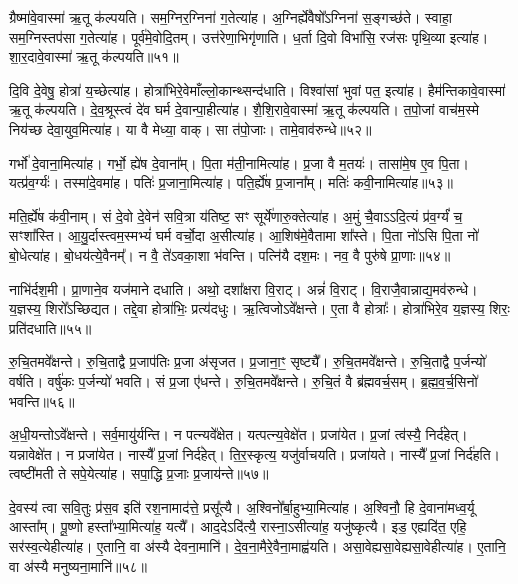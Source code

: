 ग्रैष्मा॑वे॒वास्मा॑ ऋ॒तू क॑ल्पयति। 
सम॒ग्निर॒ग्निना॑ ग॒तेत्या॑ह। 
अ॒ग्निर्ह्ये॑वैषो᳚ऽग्निना॑ स॒ङ्गच्छ॑ते। 
स्वाहा॒ सम॒ग्निस्तप॑सा ग॒तेत्या॑ह। 
पूर्व॑मे॒वोदि॒तम्। 
उत्त॑रेणा॒भिगृ॑णाति। 
ध॒र्ता दि॒वो विभा॑सि॒ रज॑सः पृथि॒व्या इत्या॑ह। 
शा॒र॒दावे॒वास्मा॑ ऋ॒तू क॑ल्पयति॥५१॥

दि॒वि दे॒वेषु॒ होत्रा॑ य॒च्छेत्या॑ह। 
होत्रा॑भिरे॒वेमाँल्लो॒कान्थ्सन्द॑\-धाति। 
विश्वा॑सां भुवां पत॒ इत्या॑ह। 
हैम॑न्तिकावे॒वास्मा॑ ऋ॒तू क॑ल्पयति। 
दे॒व॒श्रूस्त्वं दे॑व घर्म दे॒वान्पा॒हीत्या॑ह। 
शै॒शि॒रावे॒वास्मा॑ ऋ॒तू क॑ल्पयति। 
त॒पो॒जां वाच॑म॒स्मे निय॑च्छ देवा॒युव॒मित्या॑ह। 
या वै मेध्या॒ वाक्। 
सा त॑पो॒जाः। 
तामे॒वाव॑रुन्धे॥५२॥

गर्भो॑ दे॒वाना॒मित्या॑ह। 
गर्भो॒ ह्ये॑ष दे॒वाना᳚म्। 
पि॒ता म॑ती॒नामित्या॑ह। 
प्र॒जा वै म॒तयः॑। 
तासा॑मे॒ष ए॒व पि॒ता। 
यत्प्र॑व॒र्ग्यः॑। 
तस्मा॑दे॒वमा॑ह। 
पतिः॑ प्र॒जाना॒मित्या॑ह। 
पति॒र्ह्ये॑ष प्र॒जाना᳚म्। 
मतिः॑ कवी॒नामित्या॑ह॥५३॥

मति॒र्ह्ये॑ष क॑वी॒नाम्। 
सं दे॒वो दे॒वेन॑ सवि॒त्रा य॑तिष्ट॒ सꣳ सूर्ये॑णारु॒क्तेत्या॑ह। 
अ॒मुं चै॒वाऽऽदि॒त्यं प्र॑व॒र्ग्यं॑ च॒ सꣳशा᳚स्ति। 
आ॒यु॒र्दास्त्वम॒स्मभ्यं॑ घर्म वर्चो॒दा अ॒सीत्या॑ह। 
आ॒शिष॑मे॒वैतामा शा᳚स्ते। 
पि॒ता नो॑ऽसि पि॒ता नो॑ बो॒धेत्या॑ह। 
बो॒धय॑त्ये॒वैनम्᳚। 
न वै॒ ते॑ऽवका॒शा भ॑वन्ति। 
पत्नि॑यै दश॒मः। 
नव॒ वै पुरु॑षे प्रा॒णाः॥५४॥

नाभि॑र्दश॒मी। 
प्रा॒णाने॒व यज॑माने दधाति। 
अथो॒ दशा᳚क्षरा वि॒राट्। 
अन्नं॑  वि॒राट्। 
वि॒राजै॒वान्नाद्य॒मव॑रुन्धे। 
य॒ज्ञस्य॒ शिरो᳚ऽच्छिद्यत। 
तद्दे॒वा होत्रा॑भिः॒ प्रत्य॑दधुः। 
ऋ॒त्विजोऽवे᳚क्षन्ते। 
ए॒ता वै होत्राः᳚। 
होत्रा॑भिरे॒व य॒ज्ञस्य॒ शिरः॒ प्रति॑दधाति॥५५॥

रु॒चि॒तमवे᳚क्षन्ते। 
रु॒चि॒ताद्वै प्र॒जाप॑तिः प्र॒जा अ॑सृजत। 
प्र॒जाना॒ꣳ॒ सृष्ट्यै᳚। 
रु॒चि॒तमवे᳚क्षन्ते। 
रु॒चि॒ताद्वै प॒र्जन्यो॑ वर्\mbox{}षति। 
वर्\mbox{}षु॑कः प॒र्जन्यो॑ भवति। 
सं प्र॒जा ए॑धन्ते। 
रु॒चि॒तमवे᳚क्षन्ते। 
रु॒चि॒तं वै ब्र॑ह्मवर्च॒सम्। 
ब्र॒ह्म॒व॒र्च॒सिनो॑ भवन्ति॥५६॥

अ॒धी॒यन्तोऽवे᳚क्षन्ते। 
सर्व॒मायु॑र्\mbox{}यन्ति। 
न पत्न्यवे᳚क्षेत। 
यत्पत्न्य॒वेक्षे॑त। 
प्रजा॑येत। 
प्र॒जां त्व॑स्यै॒ निर्द॑हेत्। 
यन्नावेक्षे॑त। 
न प्रजा॑येत। 
नास्यै᳚ प्र॒जां निर्द॑हेत्। 
ति॒र॒स्कृत्य॒ यजु॑र्वाचयति। 
प्रजा॑यते। 
नास्यै᳚ प्र॒जां निर्द॑हति। 
त्वष्टी॑मती ते सपे॒येत्या॑ह। 
सपा॒द्धि प्र॒जाः प्र॒जाय॑न्ते॥५७॥

दे॒वस्य॑ त्वा सवि॒तुः प्र॑स॒व इति॑ रश॒नामाद॑त्ते॒ प्रसू᳚त्यै। 
अ॒श्विनो᳚र्बा॒हुभ्या॒मित्या॑ह। 
अ॒श्विनौ॒ हि दे॒वाना॑मध्व॒र्यू आस्ता᳚म्। 
पू॒ष्णो हस्ता᳚भ्या॒मित्या॑ह॒ यत्यै᳚। 
आद॒देऽदि॑त्यै॒ रास्ना॒ऽसीत्या॑ह॒ यजु॑ष्कृत्यै। 
इड॒ एह्यदि॑त॒ एहि॒ सर॑स्व॒त्येहीत्या॑ह। 
ए॒तानि॒ वा अ॑स्यै देवना॒मानि॑। 
दे॒व॒ना॒मैरे॒वैना॒माह्व॑यति। 
असा॒वेह्यसा॒वेह्यसा॒वेहीत्या॑ह। 
ए॒तानि॒ वा अ॑स्यै मनुष्यना॒मानि॑॥५८॥

